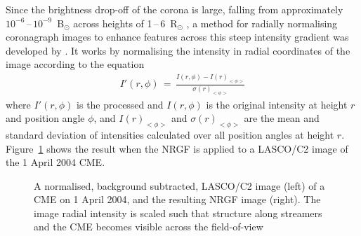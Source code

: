 \documentclass[namedreferences]{SolarPhysics}
\begin{document}
\begin{article}
Since the brightness drop-off of the corona is large, falling from approximately $10^{-6}$\,--\,$10^{-9}$~B$_{\odot}$ across heights of 1\,--\,6~R$_{\odot}$ \citep{1998EP&S...50..493K}, a method for radially normalising coronagraph images to enhance features across this steep intensity gradient was developed by \citet{2006SoPh..236..263M}. It works by normalising the intensity in radial coordinates of the image according to the equation
\begin{eqnarray}
I'(r,\phi)\,=\,\frac{I(r,\phi)-I(r)_{<\phi>}}{\sigma(r)_{<\phi>}}
\end{eqnarray}
where $I'(r,\phi)$ is the processed and $I(r,\phi)$ is the original intensity at height $r$ and position angle $\phi$, and $I(r)_{<\phi>}$ and $\sigma(r)_{<\phi>}$ are the mean and standard deviation of intensities calculated over all position angles at height $r$. Figure~\ref{im+filt} shows the result when the NRGF is applied to a LASCO/C2 image of the 1 April 2004 CME.
\begin{figure}[!ht]
\caption{A normalised, background subtracted, LASCO/C2 image (left) of a CME on 1 April 2004, and the resulting NRGF image (right). The image radial intensity is scaled such that structure along streamers and the CME becomes visible across the field-of-view}
\label{im+filt}
\end{figure}
\newline

\end{article}
\end{document}
